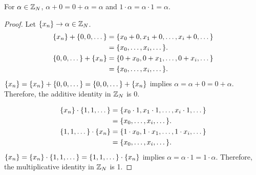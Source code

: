 \begin{lemma}\label{lem:identity}
  For $\alpha \in \mathbb{Z}_N$, $\alpha+0=0+\alpha=\alpha$ and $1\cdot\alpha=\alpha\cdot1=\alpha$.
\end{lemma}
\begin{proof}
  Let $\{x_n\}\rightarrow\alpha\in\mathbb{Z}_N$.
  \begin{align*}
    \{x_n\}+\{0,0,\dots\}&=\{x_0+0,x_1+0,\dots,x_i+0,\dots\}\\
                     &=\{x_0,\dots,x_i,\dots\}.\\
    \{0,0,\dots\}+\{x_n\}&=\{0+x_0,0+x_1,\dots,0+x_i,\dots\}\\
                     &=\{x_0,\dots,x_i,\dots\}.
  \end{align*}
  $\{x_n\}=\{x_n\}+\{0,0,\dots\}=\{0,0,\dots\}+\{x_n\}$ implies $\alpha=\alpha+0=0+\alpha$.
  Therefore, the additive identity in $\mathbb{Z}_N$ is 0.

  \begin{align*}
    \{x_n\}\cdot\{1,1,\dots\}&=\{x_0\cdot 1,x_1\cdot 1,\dots,x_i\cdot 1,\dots\}\\
                         &=\{x_0,\dots,x_i,\dots\}.\\
    \{1,1,\dots\}\cdot\{x_n\}&=\{1\cdot x_0,1\cdot x_1,\dots,1\cdot x_i,\dots\}\\
                         &=\{x_0,\dots,x_i,\dots\}.
  \end{align*}
   $\{x_n\}=\{x_n\}\cdot\{1,1,\dots\}=\{1,1,\dots\}\cdot\{x_n\}$ implies $\alpha=\alpha\cdot1=1\cdot\alpha$.
  Therefore, the multiplicative identity in $\mathbb{Z}_N$ is 1.
\end{proof}   

